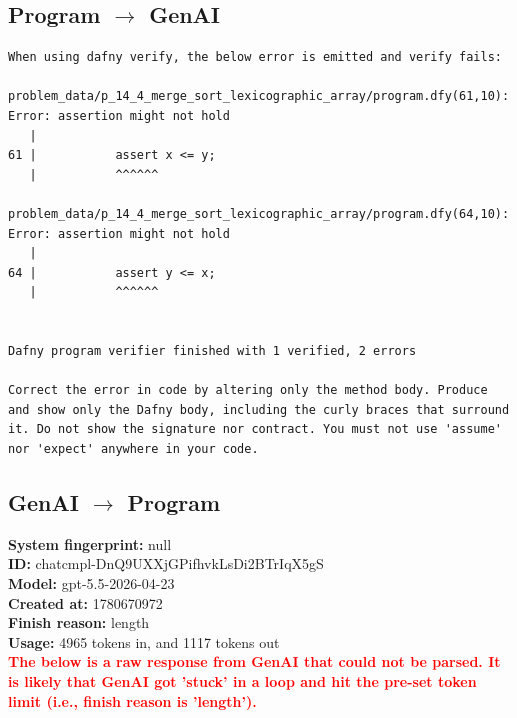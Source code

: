 \documentclass{article}
\begin{document}
\subsection*{Program $\rightarrow$ GenAI}
\begin{lstlisting}
When using dafny verify, the below error is emitted and verify fails:

problem_data/p_14_4_merge_sort_lexicographic_array/program.dfy(61,10): Error: assertion might not hold
   |
61 |           assert x <= y;
   |           ^^^^^^

problem_data/p_14_4_merge_sort_lexicographic_array/program.dfy(64,10): Error: assertion might not hold
   |
64 |           assert y <= x;
   |           ^^^^^^


Dafny program verifier finished with 1 verified, 2 errors

Correct the error in code by altering only the method body. Produce and show only the Dafny body, including the curly braces that surround it. Do not show the signature nor contract. You must not use 'assume' nor 'expect' anywhere in your code.
\end{lstlisting}
\subsection*{GenAI $\rightarrow$ Program}
\textbf{System fingerprint: }null
\\\textbf{ID: }chatcmpl-DnQ9UXXjGPifhvkLsDi2BTrIqX5gS
\\\textbf{Model: }gpt-5.5-2026-04-23
\\\textbf{Created at: }1780670972
\\\textbf{Finish reason: }length
\\\textbf{Usage: }4965 tokens in, and 1117 tokens out
\\\textcolor{red}{\textbf{The below is a raw response from GenAI that could not be parsed. It is likely that GenAI got 'stuck' in a loop and hit the pre-set token limit (i.e., finish reason is 'length').}}
\begin{lstlisting}

\end{lstlisting}
\end{document}
